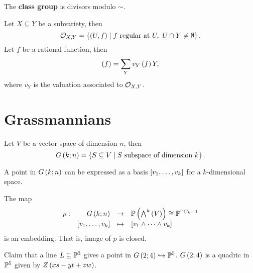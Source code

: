 \begin{definition}
The \textbf{class group} is divisors modulo $ \sim $.
\end{definition}

\begin{definition}
Let $ X \subseteq Y $ be a subvariety, then
$$ \OO_{X, Y} = \cb{\rb{U, f} \mid f \ \text{regular at} \ U, \ U \cap Y \ne \emptyset}. $$
Let $ f $ be a rational function, then
$$ \rb{f} = \sum_Y v_Y\rb{f}Y, $$
where $ v_Y $ is the valuation associated to $ \OO_{X, Y} $.
\end{definition}

\pagebreak

\section{Grassmannians}

\begin{definition}
Let $ V $ be a vector space of dimension $ n $, then
$$ G\rb{k; n} = \cb{S \subseteq V \mid S \ \text{subspace of dimension} \ k}. $$
\end{definition}

\begin{remark}
A point in $ G\rb{k; n} $ can be expressed as a basis $ \sb{v_1, \dots, v_k} $ for a $ k $-dimensional space.
\end{remark}

\begin{theorem}
The map
$$ \function[p]{G\rb{k; n}}{\P\rb{\bigwedge^k\rb{V}} \cong \P^{^nC_k - 1}}{\sb{v_1, \dots, v_k}}{\sb{v_1 \wedge \dots \wedge v_k}} $$
is an embedding. That is, image of $ p $ is closed.
\end{theorem}

\begin{example}
Claim that a line $ L \subseteq \P^3 $ gives a point in $ G\rb{2; 4} \hookrightarrow \P^5 $. $ G\rb{2; 4} $ is a quadric in $ \P^5 $ given by $ Z\rb{xs - yt + zw} $.
\end{example}


